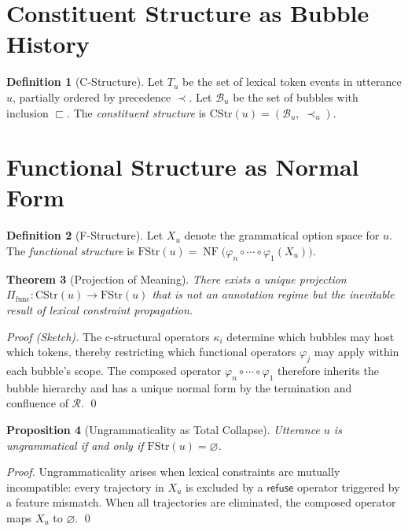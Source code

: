 \documentclass[12pt, oneside]{amsbook}
\theoremstyle{plain}
\newtheorem{theorem}{Theorem}[section]
\newtheorem{proposition}[theorem]{Proposition}
\theoremstyle{definition}
\newtheorem{definition}[theorem]{Definition}
\theoremstyle{remark}
\newcommand{\refuse}{\mathsf{refuse}}
\newcommand{\ruleR}{\mathcal{R}}
\newcommand{\CStr}{\mathrm{CStr}}
\newcommand{\FStr}{\mathrm{FStr}}
\newcommand{\HLFGproj}{\Pi_{\mathrm{func}}}
\begin{document}
\section{Constituent Structure as Bubble History}
\label{sec:hlfg:cstr}

\begin{definition}[C-Structure]
\label{def:cstr}
  Let $T_u$ be the set of lexical token events in utterance $u$, partially
  ordered by precedence $\prec$. Let $\mathcal{B}_u$ be the set of bubbles
  with inclusion $\sqsubset$. The \emph{constituent structure} is
  $\CStr(u) = (\mathcal{B}_u,\; \prec_u)$.
\end{definition}

\section{Functional Structure as Normal Form}
\label{sec:hlfg:fstr}

\begin{definition}[F-Structure]
\label{def:fstr}
  Let $X_u$ denote the grammatical option space for $u$. The
  \emph{functional structure} is
  $\FStr(u) = \operatorname{NF}\!\bigl(\varphi_n \circ \cdots \circ
  \varphi_1(X_u)\bigr)$.
\end{definition}

\begin{theorem}[Projection of Meaning]
\label{thm:hlfg-projection}
  There exists a unique projection $\HLFGproj : \CStr(u) \to \FStr(u)$ that
  is not an annotation regime but the inevitable result of lexical constraint
  propagation.
\end{theorem}

\begin{proof}[Proof (Sketch)]
The c-structural operators $\kappa_i$ determine which bubbles may host which
tokens, thereby restricting which functional operators $\varphi_j$ may apply
within each bubble's scope. The composed operator $\varphi_n \circ \cdots \circ
\varphi_1$ therefore inherits the bubble hierarchy and has a unique normal form
by the termination and confluence of $\ruleR$. \qed
\end{proof}

\begin{proposition}[Ungrammaticality as Total Collapse]
\label{prop:ungrammatical}
  Utterance $u$ is \emph{ungrammatical} if and only if
  $\FStr(u) = \varnothing$.
\end{proposition}

\begin{proof}
Ungrammaticality arises when lexical constraints are mutually incompatible:
every trajectory in $X_u$ is excluded by a $\refuse$ operator triggered by a
feature mismatch. When all trajectories are eliminated, the composed operator
maps $X_u$ to $\varnothing$. \qed
\end{proof}
\end{document}
